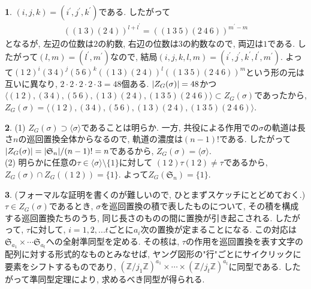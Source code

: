 \documentclass{article}
\theoremstyle{definition}
\newtheorem{ans}{}
\numberwithin{ans}{subsection}
\DeclarePairedDelimiter{\abs}{\lvert}{\rvert}
\begin{document}
\begin{ans}
  $(i, j, k) = (i^\prime, j^\prime, k^\prime)$である. したがって
  \begin{align*}
    ((1\ 3)(2\ 4))^{l + l^\prime} = ((1\ 3\ 5)(2\ 4\ 6))^{m^\prime - m}
  \end{align*}
  となるが, 左辺の位数は$2$の約数, 右辺の位数は$3$の約数なので, 両辺は$1$である.
  したがって$(l, m) = (l^\prime, m^\prime)$なので, 結局$(i, j, k, l, m) = (i^\prime, j^\prime, k^\prime, l^\prime, m^\prime)$.
  よって$(1\ 2)^i(3\ 4)^j(5\ 6)^k((1\ 3)(2\ 4))^l((1\ 3\ 5)(2\ 4\ 6))^m$という形の元は互いに異なり,
  $2 \cdot 2 \cdot 2 \cdot 2 \cdot 3 = 48$個ある.
  $\abs{Z_G(\sigma)} = 48$かつ
  $\langle (1\ 2), (3\ 4), (5\ 6), (1\ 3)(2\ 4), (1\ 3\ 5)(2\ 4\ 6) \rangle \subset Z_G(\sigma)$であったから,
  $Z_G(\sigma) = \langle (1\ 2), (3\ 4), (5\ 6), (1\ 3)(2\ 4), (1\ 3\ 5)(2\ 4\ 6) \rangle$.
\end{ans}

\begin{ans}
  (1) $Z_G(\sigma) \supset \langle \sigma \rangle$であることは明らか.
  一方, 共役による作用での$\sigma$の軌道は長さ$n$の巡回置換全体からなるので, 軌道の濃度は$(n - 1)!$である.
  したがって$\abs{Z_G(\sigma)} = \abs{\mathfrak{S}_n}/(n - 1)! = n$であるから, $Z_G(\sigma) = \langle \sigma \rangle$.\\
  (2) 明らかに任意の$\tau \in \langle \sigma \rangle \setminus \{1\}$に対して
  $(1\ 2)\tau(1\ 2) \neq \tau$であるから, $Z_G(\sigma) \cap Z_G((1\ 2)) = \{1\}$.
  よって$Z_G(\mathfrak{S}_n) = \{1\}$.
\end{ans}

\begin{ans}
  (フォーマルな証明を書くのが難しいので, ひとまずスケッチにとどめておく.)
  $\tau \in Z_G(\sigma)$であるとき, $\sigma$を巡回置換の積で表したものについて,
  その積を構成する巡回置換たちのうち, 同じ長さのものの間に置換が引き起こされる.
  したがって, $\tau$に対して, $i = 1, 2,... t$ごとに$a_i$次の置換が定まることになる.
  この対応は$\mathfrak{S}_{a_1} \times \cdots \mathfrak{S}_{a_t}$への全射準同型を定める.
  その核は, $\tau$の作用を巡回置換を表す文字の配列に対する形式的なものとみなせば, ヤング図形の"行"ごとにサイクリックに要素をシフトするものであり,
  $(\mathbb{Z}/j_1\mathbb{Z})^{a_1} \times \cdots \times (\mathbb{Z}/j_t\mathbb{Z})^{a_t}$に同型である.
  したがって準同型定理により, 求めるべき同型が得られる.
\end{ans}
\end{document}
